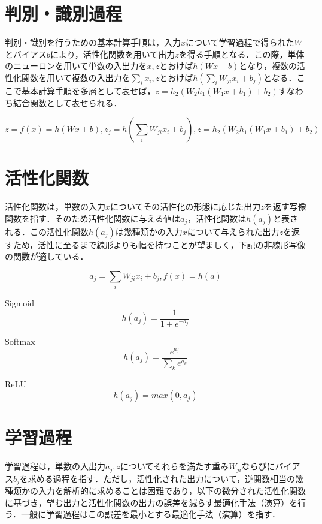 \documentclass{jsarticle}
\begin{document}
\section{判別・識別過程}
\label{判別・識別過程}

判別・識別を行うための基本計算手順は，入力$x$について学習過程で得られた$W$とバイアス$b$により，活性化関数を用いて出力$z$を得る手順となる．この際，単体のニューロンを用いて単数の入出力を$x,z$とおけば$h(Wx+b)$となり，複数の活性化関数を用いて複数の入出力を$\sum_{i} x_i,z$とおけば$h(\sum_{i} W_{ji} x_{i} + b_{j})$となる．ここで基本計算手順を多層として表せば，$z=h_2(W_2 h_1(W_1x+b_1) + b_2)$すなわち結合関数として表せられる．

\[
z=f(x)=h(W x + b),
z_j=h(\sum_{i} W_{ji} x_{i} + b_{j}),
z=h_2(W_2 h_1(W_1x+b_1) + b_2)
\]

\section{活性化関数}
\label{活性化関数}

活性化関数は，単数の入力$x$についてその活性化の形態に応じた出力$z$を返す写像関数を指す．そのため活性化関数に与える値は$a_{j}$，活性化関数は$h(a_{j})$と表される．この活性化関数$h(a_{j})$は幾種類かの入力$x$について与えられた出力$z$を返すため，活性に至るまで線形よりも幅を持つことが望ましく，下記の非線形写像の関数が適している．

\[
a_{j}=\sum_{i} W_{ji} x_{i} + b_{j},
f(x)=h(a)
\]

\begin{itembox}[l]{Sigmoid}
\[
h(a_j)=\frac{1}{1+e^{-a_j}}
\]
\end{itembox}

\begin{itembox}[l]{Softmax}
\[
h(a_j)=\frac{e^{a_j}}{\sum_{k} e^{a_k}}
\]
\end{itembox}

\begin{itembox}[l]{ReLU}
\[
h(a_j)=max(0,a_j)
\]
\end{itembox}

\section{学習過程}
\label{学習過程}

学習過程は，単数の入出力$a_j,z$についてそれらを満たす重み$W_{ji}$ならびにバイアス$b_j$を求める過程を指す．ただし，活性化された出力について，逆関数相当の幾種類かの入力を解析的に求めることは困難であり，以下の微分された活性化関数に基づき，望む出力と活性化関数の出力の誤差を減らす最適化手法（演算）を行う．一般に学習過程はこの誤差を最小とする最適化手法（演算）を指す．
\end{document}
